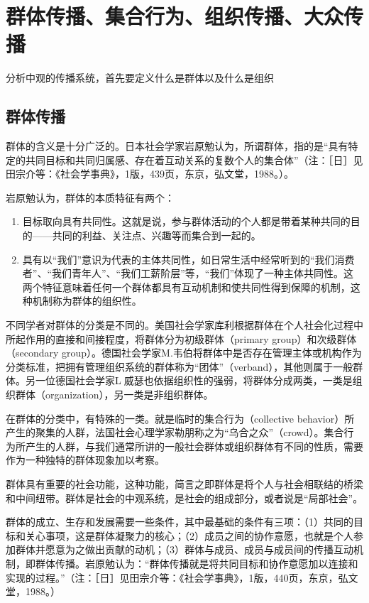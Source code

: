 \documentclass[UTF8,12pt]{ctexart}
\numberwithin{equation}{section} %
\numberwithin{figure}{section}
\numberwithin{table}{section}
\begin{document}
	\section{群体传播、集合行为、组织传播、大众传播}
	分析中观的传播系统，首先要定义什么是群体以及什么是组织
	
	\subsection{群体传播}
	群体的含义是十分广泛的。日本社会学家岩原勉认为，所谓群体，指的是“具有特定的共同目标和共同归属感、存在着互动关系的复数个人的集合体”（注：［日］见田宗介等：《社会学事典》，1版，439页，东京，弘文堂，1988。）。
	
	岩原勉认为，群体的本质特征有两个：
	\begin{enumerate}
		\item 目标取向具有共同性。这就是说，参与群体活动的个人都是带着某种共同的目的——共同的利益、关注点、兴趣等而集合到一起的。
		
		\item 具有以“我们”意识为代表的主体共同性，如日常生活中经常听到的“我们消费者”、“我们青年人”、“我们工薪阶层”等，“我们”体现了一种主体共同性。这两个特征意味着任何一个群体都具有互动机制和使共同性得到保障的机制，这种机制称为群体的组织性。
		
	\end{enumerate}
	
	不同学者对群体的分类是不同的。美国社会学家库利根据群体在个人社会化过程中所起作用的直接和间接程度，将群体分为初级群体（primary group）和次级群体（secondary group）。德国社会学家M.韦伯将群体中是否存在管理主体或机构作为分类标准，把拥有管理组织系统的群体称为“团体”（verband），其他则属于一般群体。另一位德国社会学家L威瑟也依据组织性的强弱，将群体分成两类，一类是组织群体（organization），另一类是非组织群体。
	
	在群体的分类中，有特殊的一类。就是临时的集合行为（collective behavior）所产生的聚集的人群，法国社会心理学家勒朋称之为“乌合之众”（crowd）。集合行为所产生的人群，与我们通常所讲的一般社会群体或组织群体有不同的性质，需要作为一种独特的群体现象加以考察。

	
	群体具有重要的社会功能，这种功能，简言之即群体是将个人与社会相联结的桥梁和中间纽带。群体是社会的中观系统，是社会的组成部分，或者说是“局部社会”。
	
	群体的成立、生存和发展需要一些条件，其中最基础的条件有三项：（1）共同的目标和关心事项，这是群体凝聚力的核心；（2）成员之间的协作意愿，也就是个人参加群体并愿意为之做出贡献的动机；（3）群体与成员、成员与成员间的传播互动机制，即群体传播。岩原勉认为：“群体传播就是将共同目标和协作意愿加以连接和实现的过程。”（注：［日］见田宗介等：《社会学事典》，1版，440页，东京，弘文堂，1988。）
	
\end{document}
